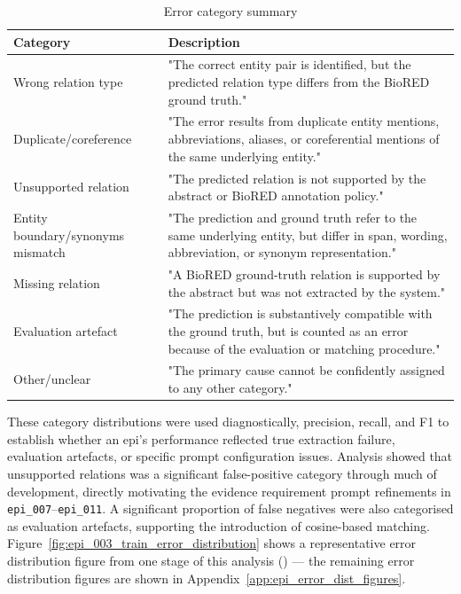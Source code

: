 \begin{table}[H]
    \centering
    \caption{Error category summary}
    \label{tab:error_categories}
    \begin{tabularx}{\textwidth}{l X}
        \toprule
        Category & Description \\
        \midrule
        Wrong relation type & "The correct entity pair is identified, but the predicted relation type differs from the BioRED ground truth." \\
        Duplicate/coreference & "The error results from duplicate entity mentions, abbreviations, aliases, or coreferential mentions of the same underlying entity." \\
        Unsupported relation & "The predicted relation is not supported by the abstract or BioRED annotation policy." \\
        Entity boundary/synonyms mismatch & "The prediction and ground truth refer to the same underlying entity, but differ in span, wording, abbreviation, or synonym representation." \\
        Missing relation & "A BioRED ground-truth relation is supported by the abstract but was not extracted by the system." \\
        Evaluation artefact & "The prediction is substantively compatible with the ground truth, but is counted as an error because of the evaluation or matching procedure." \\
        Other/unclear & "The primary cause cannot be confidently assigned to any other category." \\
        \bottomrule
    \end{tabularx}
\end{table}

These category distributions were used diagnostically, precision, recall, and F1 to establish whether an \gls{epi}'s performance reflected true extraction failure, evaluation artefacts, or specific prompt configuration issues. Analysis showed that unsupported relations was a significant false-positive category through much of development, directly motivating the evidence requirement prompt refinements in \texttt{epi\_007}--\texttt{epi\_011}. A significant proportion of false negatives were also categorised as evaluation artefacts, supporting the introduction of cosine-based matching. Figure~\ref{fig:epi_003_train_error_distribution} shows a representative error distribution figure from one stage of this analysis () --- the remaining error distribution figures are shown in Appendix~\ref{app:epi_error_dist_figures}.

